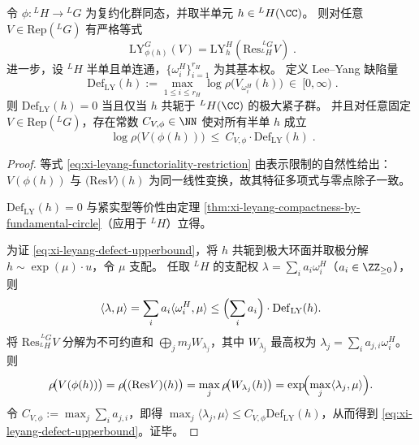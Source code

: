 \begin{proposition}\label{prop:xi-leyang-functoriality-defect-bound}
令 \(\phi:{}^{L}H\to {}^{L}G\) 为复约化群同态，并取半单元 \(h\in {}^{L}H(\CC)\)。
则对任意 \(V\in\mathrm{Rep}({}^{L}G)\) 有严格等式
\begin{equation}\label{eq:xi-leyang-functoriality-restriction}
\boxed{\;
\mathrm{LY}^{G}_{\phi(h)}(V)
=\mathrm{LY}^{H}_{h}\!\left(\mathrm{Res}^{\,{}^{L}G}_{{}^{L}H}V\right)\; }.
\end{equation}
进一步，设 \({}^{L}H\) 半单且单连通，\(\{\omega_i^{H}\}_{i=1}^{r_H}\) 为其基本权。
定义 Lee--Yang 缺陷量
\begin{equation}\label{eq:xi-leyang-defect}
\boxed{\;
\mathrm{Def}_{\mathrm{LY}}(h)
:=\max_{1\le i\le r_H}\log \rho\!\bigl(V_{\omega_i^{H}}(h)\bigr)\ \in\ [0,\infty)\; }.
\end{equation}
则 \(\mathrm{Def}_{\mathrm{LY}}(h)=0\) 当且仅当 \(h\) 共轭于 \({}^{L}H(\CC)\) 的极大紧子群。
并且对任意固定 \(V\in\mathrm{Rep}({}^{L}G)\)，存在常数 \(C_{V,\phi}\in\NN\) 使对所有半单 \(h\) 成立
\begin{equation}\label{eq:xi-leyang-defect-upperbound}
\boxed{\;
\log \rho\!\bigl(V(\phi(h))\bigr)\ \le\ C_{V,\phi}\cdot \mathrm{Def}_{\mathrm{LY}}(h)\; }.
\end{equation}
\end{proposition}
\begin{proof}
等式 \eqref{eq:xi-leyang-functoriality-restriction} 由表示限制的自然性给出：\(V(\phi(h))\) 与 \(\bigl(\mathrm{Res}V\bigr)(h)\) 为同一线性变换，故其特征多项式与零点除子一致。
\par
\(\mathrm{Def}_{\mathrm{LY}}(h)=0\) 与紧实型等价性由定理 \ref{thm:xi-leyang-compactness-by-fundamental-circle}（应用于 \({}^{L}H\)）立得。
\par
为证 \eqref{eq:xi-leyang-defect-upperbound}，将 \(h\) 共轭到极大环面并取极分解 \(h\sim \exp(\mu)\cdot u\)，令 \(\mu\) 支配。
任取 \({}^{L}H\) 的支配权 \(\lambda=\sum_i a_i\omega_i^{H}\)（\(a_i\in\ZZ_{\ge 0}\)），则
\[
\langle\lambda,\mu\rangle=\sum_i a_i\langle\omega_i^{H},\mu\rangle
\le \Bigl(\sum_i a_i\Bigr)\cdot \mathrm{Def}_{\mathrm{LY}}(h).
\]
将 \(\mathrm{Res}^{\,{}^{L}G}_{{}^{L}H}V\) 分解为不可约直和 \(\bigoplus_j m_j W_{\lambda_j}\)，其中 \(W_{\lambda_j}\) 最高权为 \(\lambda_j=\sum_i a_{j,i}\omega_i^{H}\)。
则
\[
\rho\!\bigl(V(\phi(h))\bigr)=\rho\!\bigl((\mathrm{Res}V)(h)\bigr)
=\max_j \rho\!\bigl(W_{\lambda_j}(h)\bigr)
=\exp\!\Bigl(\max_j\langle\lambda_j,\mu\rangle\Bigr).
\]
令 \(C_{V,\phi}:=\max_j\sum_i a_{j,i}\)，即得 \(\max_j\langle\lambda_j,\mu\rangle\le C_{V,\phi}\mathrm{Def}_{\mathrm{LY}}(h)\)，从而得到 \eqref{eq:xi-leyang-defect-upperbound}。证毕。
\end{proof}

